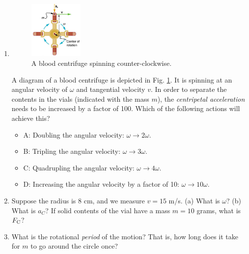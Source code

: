 \documentclass{article}
\begin{document}
\begin{enumerate}
\item 
\begin{figure}[ht]
\centering
\includegraphics[width=0.25\textwidth]{cent.png}
\caption{\label{fig:cent} A blood centrifuge spinning counter-clockwise.}
\end{figure}

A diagram of a blood centrifuge is depicted in Fig. \ref{fig:cent}.  It is spinning at an angular velocity of $\omega$ and tangential velocity $v$.  In order to separate the contents in the vials (indicated with the mass $m$), the \textit{centripetal acceleration} needs to be increased by a factor of 100.  Which of the following actions will achieve this?
\begin{itemize}
\item A: Doubling the angular velocity: $\omega \rightarrow 2\omega$.
\item B: Tripling the angular velocity: $\omega \rightarrow 3\omega$.
\item C: Quadrupling the angular velocity: $\omega \rightarrow 4\omega$.
\item D: Increasing the angular velocity by a factor of 10: $\omega \rightarrow 10\omega$.
\end{itemize}
\item Suppose the radius is 8 cm, and we measure $v = 15$ m/s.  (a) What is $\omega$?  (b) What is $a_C$?  If solid contents of the vial have a mass $m = 10$ grams, what is $F_{\rm C}$? \\ \vspace{2cm}
\item What is the rotational \textit{period} of the motion?  That is, how long does it take for $m$ to go around the circle once?
\end{enumerate}
\end{document}
